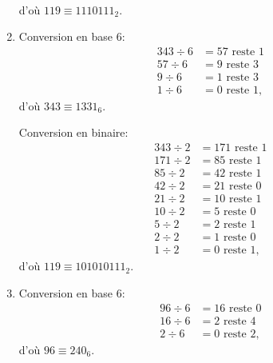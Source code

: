 \begin{exercice}
\begin{sol}
\begin{enumerate}
\begin{minipage}[t]{0.48\linewidth}
\begin{align*}
        \end{align*}
        d'où $119 \equiv 1110111_2$.
      \end{minipage}
    \item
      \begin{minipage}[t]{0.48\linewidth}
        Conversion en base 6:
        \begin{align*}
          343 \div 6 &= 57 \text{ reste } 1 \\
           57 \div 6 &= 9 \text{ reste } 3 \\
            9 \div 6 &= 1 \text{ reste } 3 \\
            1 \div 6 &= 0 \text{ reste } 1,
        \end{align*}
        d'où $343 \equiv 1331_6$.
      \end{minipage}
      \hfill
      \begin{minipage}[t]{0.48\linewidth}
        Conversion en binaire:
        \begin{align*}
          343 \div 2 &= 171 \text{ reste } 1 \\
          171 \div 2 &= 85 \text{ reste } 1 \\
           85 \div 2 &= 42 \text{ reste } 1 \\
           42 \div 2 &= 21 \text{ reste } 0 \\
           21 \div 2 &= 10 \text{ reste } 1 \\
           10 \div 2 &= 5 \text{ reste } 0 \\
            5 \div 2 &= 2 \text{ reste } 1 \\
            2 \div 2 &= 1 \text{ reste } 0 \\
            1 \div 2 &= 0 \text{ reste } 1,
        \end{align*}
        d'où $119 \equiv 101010111_2$.
      \end{minipage}
    \item
      \begin{minipage}[t]{0.48\linewidth}
        Conversion en base 6:
        \begin{align*}
          96 \div 6 &= 16 \text{ reste } 0 \\
          16 \div 6 &= 2 \text{ reste } 4 \\
           2 \div 6 &= 0 \text{ reste } 2,
        \end{align*}
        d'où $96 \equiv 240_6$.
      \end{minipage}
      \hfill
      \begin{minipage}[t]{0.48\linewidth}

\end{minipage}
\end{enumerate}
\end{sol}
\end{exercice}
